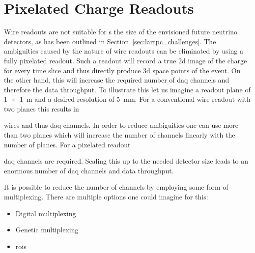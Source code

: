\section{Pixelated Charge Readouts}
\label{sec:studies_pixel-ro}

Wire readouts are not suitable for \lartpc{}s the size of the envisioned future neutrino detectors, as has been outlined in Section~\ref{sec:lartpc_challenges}.
The ambiguities caused by the nature of wire readouts can be eliminated by using a fully pixelated readout.
Such a readout will record a true \gls{2d} image of the charge for every time slice and thus directly produce \gls{3d} space points of the event.
On the other hand, this will increase the required number of \gls{daq} channels and therefore the data throughput.
To illustrate this let us imagine a readout plane of \SI{1 x 1}{\metre} and a desired resolution of \SI{5}{\milli\metre}.
For a conventional wire readout with two planes this results in


wires and thus \gls{daq} channels.
In order to reduce ambiguities one can use more than two planes which will increase the number of channels linearly with the number of planes.
For a pixelated readout


\gls{daq} channels are required.
Scaling this up to the needed detector size leads to an enormous number of \gls{daq} channels and data throughput.

It is possible to reduce the number of channels by employing some form of multiplexing.
There are multiple options one could imagine for this:
\begin{itemize}
	\item Digital multiplexing
	\item Genetic multiplexing
	\item \glspl{roi}
\end{itemize}

